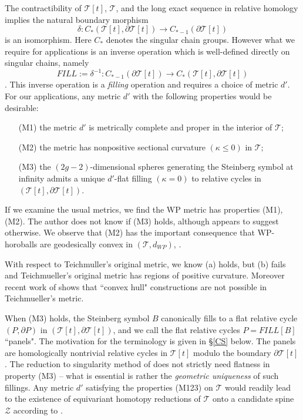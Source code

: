 \documentclass[12pt]{amsart}
\theoremstyle{definition}
\theoremstyle{remark}
\newcommand{\del}{\partial}
\newcommand{\sT}{\mathscr{T}}
\newcommand{\sZ}{\mathscr{Z}}
\begin{document}
The contractibility of $\sT[t]$, $\sT$, and the long exact sequence in relative homology implies the natural boundary morphism $$\delta: C_*(\sT[t], \del \sT[t]) \to C_{*-1}(\del \sT[t])$$ is an isomorphism. Here $C_*$ denotes the singular chain groups. However what we require for applications is an inverse operation which is well-defined directly on singular chains, namely $$FILL:=\delta^{-1}: C_{*-1}(\del \sT[t]) \to C_*(\sT[t], \del \sT[t])$$. This inverse operation is a \emph{filling} operation and requires a choice of metric $d'$. For our applications, any metric $d'$ with the following properties would be desirable:
\begin{itemize}
\item[(M1)] the metric $d'$ is metrically complete and proper in the interior of $\sT$;
\item[(M2)] the metric has nonpositive sectional curvature $(\kappa \leq 0)$ in $\sT$;
\item[(M3)] the $(2g-2)$-dimensional spheres generating the Steinberg symbol at infinity admits a unique $d'$-flat filling $(\kappa =0)$ to relative cycles in $(\sT[t], \del \sT[t])$.
\end{itemize}

If we examine the usual metrics, we find the WP metric has properties (M1), (M2). The author does not know if (M3) holds, although \cite{FarbRank} appears to suggest otherwise. We observe that (M2) has the important consequence that WP-horoballs are geodesically convex in $(\sT, d_{WP})$, \cite{GroCurv}. 

With respect to Teichmuller's original metric, we know (a) holds, but (b) fails and Teichmueller's original metric has regions of positive curvature. Moreover recent work of \cite{RafiBourque} shows that ``convex hull" constructions are not possible in Teichmueller's metric.

When (M3) holds, the Steinberg symbol $B$ canonically fills to a flat relative cycle $(P, \del P)$ in $(\sT[t], \del \sT[t])$, and we call the flat relative cycles $P=FILL[B]$ ``panels". The motivation for the terminology is given in \S \eqref{CS} below. The panels are homologically nontrivial relative cycles in $\sT[t]$ modulo the boundary $\del \sT[t]$. The reduction to singularity method of \cite{martel} does not strictly need flatness in property (M3) -- what is essential is rather the \emph{geometric uniqueness} of such fillings. Any metric $d'$ satisfying the properties (M123) on $\sT$ would readily lead to the existence of equivariant homotopy reductions of $\sT$ onto a candidate spine $\sZ$ according to \cite{martel}. 
\end{document}
